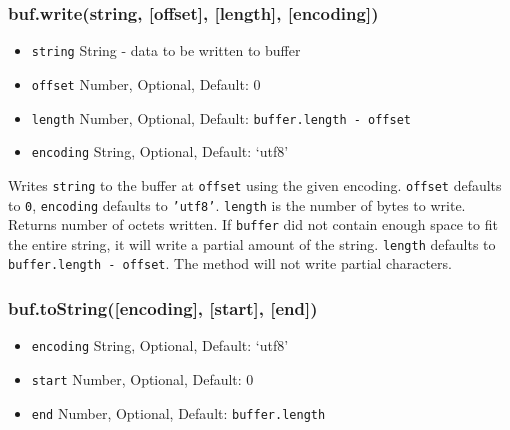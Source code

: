 \subsubsection{buf.write(string, {[}offset{]}, {[}length{]},
{[}encoding{]})}\label{buf.writestring-offset-length-encoding}

\begin{itemize}
\itemsep1pt\parskip0pt
\item
  \texttt{string} String - data to be written to buffer
\item
  \texttt{offset} Number, Optional, Default: 0
\item
  \texttt{length} Number, Optional, Default:
  \texttt{buffer.length - offset}
\item
  \texttt{encoding} String, Optional, Default: `utf8'
\end{itemize}

Writes \texttt{string} to the buffer at \texttt{offset} using the given
encoding. \texttt{offset} defaults to \texttt{0}, \texttt{encoding}
defaults to \texttt{'utf8'}. \texttt{length} is the number of bytes to
write. Returns number of octets written. If \texttt{buffer} did not
contain enough space to fit the entire string, it will write a partial
amount of the string. \texttt{length} defaults to
\texttt{buffer.length - offset}. The method will not write partial
characters.

\begin{Shaded}
\begin{Highlighting}[]
 \NormalTok{(}\NormalTok{);}
\NormalTok{(}\NormalTok{, }\NormalTok{);}
 \NormalTok{+ }\NormalTok{(}\NormalTok{, }
\end{Highlighting}
\end{Shaded}

\subsubsection{buf.toString({[}encoding{]}, {[}start{]},
{[}end{]})}\label{buf.tostringencoding-start-end}

\begin{itemize}
\itemsep1pt\parskip0pt
\item
  \texttt{encoding} String, Optional, Default: `utf8'
\item
  \texttt{start} Number, Optional, Default: 0
\item
  \texttt{end} Number, Optional, Default: \texttt{buffer.length}
\end{itemize}

